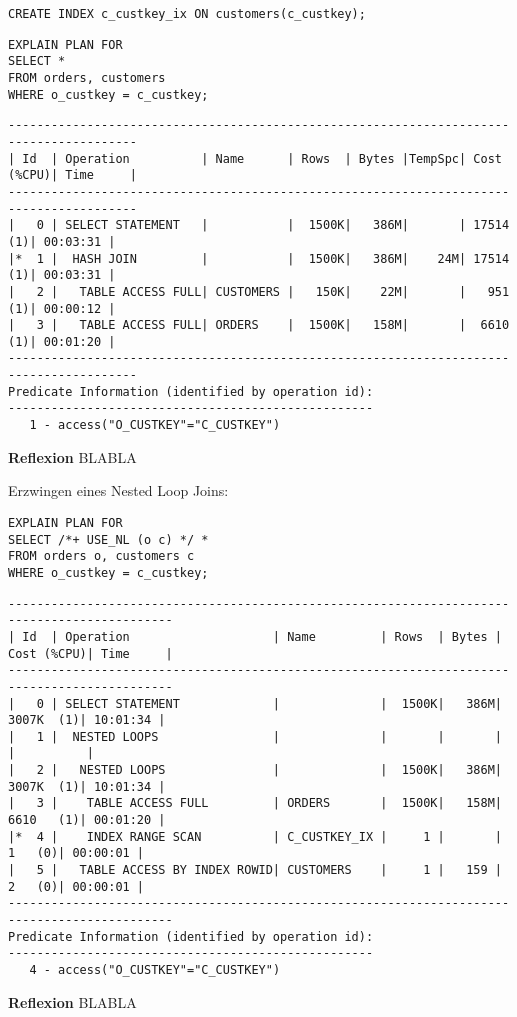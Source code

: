 \documentclass[10pt]{article}
\begin{document}
\begin{lstlisting}[style=sql]
CREATE INDEX c_custkey_ix ON customers(c_custkey);
\end{lstlisting}
\begin{lstlisting}[style=sql]
EXPLAIN PLAN FOR
SELECT *
FROM orders, customers
WHERE o_custkey = c_custkey;
\end{lstlisting}
\begin{lstlisting}[style=queryexecutionplan]
----------------------------------------------------------------------------------------
| Id  | Operation          | Name      | Rows  | Bytes |TempSpc| Cost (%CPU)| Time     |
----------------------------------------------------------------------------------------
|   0 | SELECT STATEMENT   |           |  1500K|   386M|       | 17514   (1)| 00:03:31 |
|*  1 |  HASH JOIN         |           |  1500K|   386M|    24M| 17514   (1)| 00:03:31 |
|   2 |   TABLE ACCESS FULL| CUSTOMERS |   150K|    22M|       |   951   (1)| 00:00:12 |
|   3 |   TABLE ACCESS FULL| ORDERS    |  1500K|   158M|       |  6610   (1)| 00:01:20 |
----------------------------------------------------------------------------------------
Predicate Information (identified by operation id):
---------------------------------------------------
   1 - access("O_CUSTKEY"="C_CUSTKEY")
\end{lstlisting}
\textbf{Reflexion} \newline
BLABLA

Erzwingen eines Nested Loop Joins:
\begin{lstlisting}[style=sql]
EXPLAIN PLAN FOR
SELECT /*+ USE_NL (o c) */ *
FROM orders o, customers c
WHERE o_custkey = c_custkey;
\end{lstlisting}
\begin{lstlisting}[style=queryexecutionplan]
---------------------------------------------------------------------------------------------
| Id  | Operation                    | Name         | Rows  | Bytes | Cost (%CPU)| Time     |
---------------------------------------------------------------------------------------------
|   0 | SELECT STATEMENT             |              |  1500K|   386M|  3007K  (1)| 10:01:34 |
|   1 |  NESTED LOOPS                |              |       |       |            |          |
|   2 |   NESTED LOOPS               |              |  1500K|   386M|  3007K  (1)| 10:01:34 |
|   3 |    TABLE ACCESS FULL         | ORDERS       |  1500K|   158M|  6610   (1)| 00:01:20 |
|*  4 |    INDEX RANGE SCAN          | C_CUSTKEY_IX |     1 |       |     1   (0)| 00:00:01 |
|   5 |   TABLE ACCESS BY INDEX ROWID| CUSTOMERS    |     1 |   159 |     2   (0)| 00:00:01 |
---------------------------------------------------------------------------------------------
Predicate Information (identified by operation id):
---------------------------------------------------
   4 - access("O_CUSTKEY"="C_CUSTKEY")
\end{lstlisting}
\textbf{Reflexion} \newline
BLABLA
\end{document}
